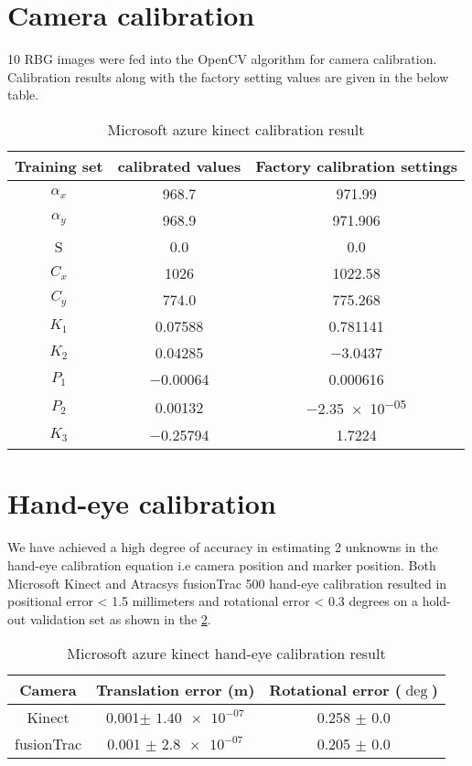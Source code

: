 \section{Camera calibration} 10 RBG images were fed into the OpenCV algorithm for camera calibration. Calibration results along with the factory setting values are given in the below table.

\begin{table}[hbt]
	\centering
	\begin{tabular}{|c|c|c|}
		\hline
		Training set & calibrated values & Factory calibration settings\\ 
		\hline
		$\alpha_x$  & \num{968.7}  & \num{971.99}\\
		$\alpha_y$ & \num{968.9} & \num{971.906}\\
		S & 0.0 & 0.0\\
		$C_x$ & \num{1026} & \num{1022.58} \\
		$C_y$ & \num{774.0} & \num{775.268} \\
		$K_1$ & \num{0.07588} & \num{0.781141} \\
		$K_2$ & \num{0.04285}  & \num{-3.0437}\\
		$P_1$ & \num{-0.00064} & \num{0.000616}\\
		$P_2$ & \num{0.00132}  & \num{-2.35e-05} \\
		$K_3$ & \num{-0.25794} & \num{1.7224} \\
		\hline
	\end{tabular}
	\caption{Microsoft azure kinect calibration result}
	\label{tab:kinect_camera_calibration_result}
\end{table}

\section{Hand-eye calibration}

We have achieved a high degree of accuracy in estimating 2 unknowns in the hand-eye calibration equation i.e camera position and marker position. Both Microsoft Kinect and Atracsys fusionTrac 500 hand-eye calibration resulted in positional error < 1.5 millimeters and rotational error < 0.3 degrees on a hold-out validation set as shown in the \cref{tab:kinect__fusionTrac_handeye_result}.

\begin{table}[hbt!]
	\centering
	\begin{tabular}{|c|c|c|}
		\hline
		Camera & Translation error (m) & Rotational error ($\deg$)\\ 
		\hline
		Kinect & 0.001$\pm$ $\num{1.40e-07}$  & 0.258 $\pm$ $\num{0.0}$\\
		fusionTrac & 0.001 $\pm$ $\num{2.8e-07}$  & 0.205 $\pm$ $\num{0.0}$\\
		\hline
	\end{tabular}
	\caption{Microsoft azure kinect hand-eye calibration result}
	\label{tab:kinect__fusionTrac_handeye_result}
\end{table}

